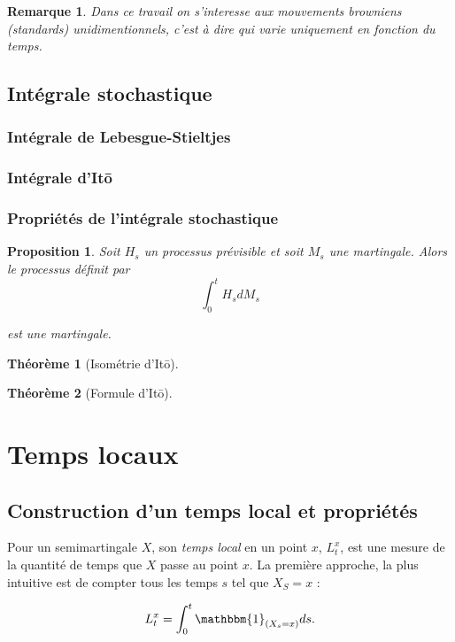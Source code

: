 \documentclass[openany]{book}
\newcommand{\1}{\mathbbm{1}}
\theoremstyle{thmfont}
\newtheorem{theorem}{Théorème}[chapter]
\theoremstyle{deffont}
\theoremstyle{thmfont}
\newtheorem{prop}[prop]{Proposition}
\theoremstyle{deffont}
\newtheorem*{remark}{Remarque}
\begin{document}
\begin{remark}
  Dans ce travail on s'interesse aux mouvements browniens (standards) unidimentionnels, c'est à dire qui varie uniquement en fonction du temps. 
\end{remark}


\section{Intégrale stochastique}  
\subsection{Intégrale de Lebesgue-Stieltjes}
\subsection{Intégrale d'Itō}
\subsection{Propriétés de l'intégrale stochastique}
{\color{red}
\begin{prop}
  Soit $H_s$ un processus prévisible et soit $M_s$ une martingale. Alors le processus définit par 
  $$\int_0^t H_s dM_s$$

  est une martingale.
\end{prop}
}

{\color{red}
\begin{theorem}[Isométrie d'Itō]
\end{theorem}

\begin{theorem}[Formule d'Itō]  
\end{theorem}
}

\chapter{Temps locaux}
\section{Construction d'un temps local et propriétés}\label{sec:ConstrTempsLoc}

Pour un semimartingale $X$, son \textit{temps local} en un point $x$, $L_t^x$, est une mesure de la quantité de temps que $X$ passe au point $x$. La première approche, la plus intuitive est de compter tous les temps $s$ tel que $X_S = x$ :

\begin{equation}
  \label{eq:TmpsLocalDef1}
   L^x_t= \int_0^t\1_{(X_s=x)}ds.
  \end{equation}
\end{document}

